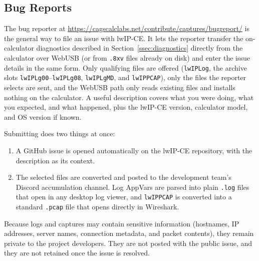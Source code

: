 \documentclass[titlepage]{report}
\begin{document}
	\subsection{Bug Reports}\label{ssec:bug_reports}
	The bug reporter at \url{https://cagscalclabs.net/contribute/captures/bugreport/} is the general way to file an issue with lwIP-CE. It lets the reporter transfer the on-calculator diagnostics described in Section~\ref{ssec:diagnostics} directly from the calculator over WebUSB (or from \texttt{.8xv} files already on disk) and enter the issue details in the same form. Only qualifying files are offered (\texttt{lwIPLog}, the archive slots \texttt{lwIPLg00}--\texttt{lwIPLg08}, \texttt{lwIPLgMD}, and \texttt{lwIPPCAP}), only the files the reporter selects are sent, and the WebUSB path only reads existing files and installs nothing on the calculator. A useful description covers what you were doing, what you expected, and what happened, plus the lwIP-CE version, calculator model, and OS version if known.

	Submitting does two things at once:
	\begin{enumerate}
		\item A GitHub issue is opened automatically on the lwIP-CE repository, with the description as its context.
		\item The selected files are converted and posted to the development team's Discord accumulation channel. Log AppVars are parsed into plain \texttt{.log} files that open in any desktop log viewer, and \texttt{lwIPPCAP} is converted into a standard \texttt{.pcap} file that opens directly in Wireshark.
	\end{enumerate}

	Because logs and captures may contain sensitive information (hostnames, IP addresses, server names, connection metadata, and packet contents), they remain private to the project developers. They are not posted with the public issue, and they are not retained once the issue is resolved.
\end{document}
